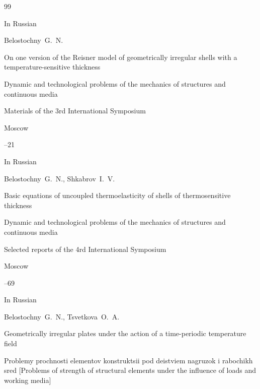 \EngRef







\begin{thebibliography}{99}




\lang In Russian

\by Belostochny~G.~N.

\paper On one version of the Reisner model of geometrically irregular shells with a temperature-sensitive thickness

\inbook Dynamic and technological problems of the mechanics of structures and continuous media

\bookinfo Materials of the 3rd International Symposium

\publaddr Moscow


--21








\lang In Russian

\by Belostochny~G.~N., Shkabrov~I.~V.

\paper Basic equations of uncoupled thermoelasticity of shells of thermosensitive thickness

\inbook Dynamic and technological problems of the mechanics of structures and continuous media

\bookinfo Selected reports of the 4rd International Symposium

\publaddr Moscow


--69










\lang In Russian

\by Belostochny~G.~N., Tsvetkova~O.~A.

\paper Geometrically irregular plates under the action of a time-periodic temperature field

\inbook Problemy prochnosti elementov konstruktsii pod deistviem nagruzok i rabochikh sred \rm [Problems of strength of structural elements under the influence of loads and working media]


\end{thebibliography}
